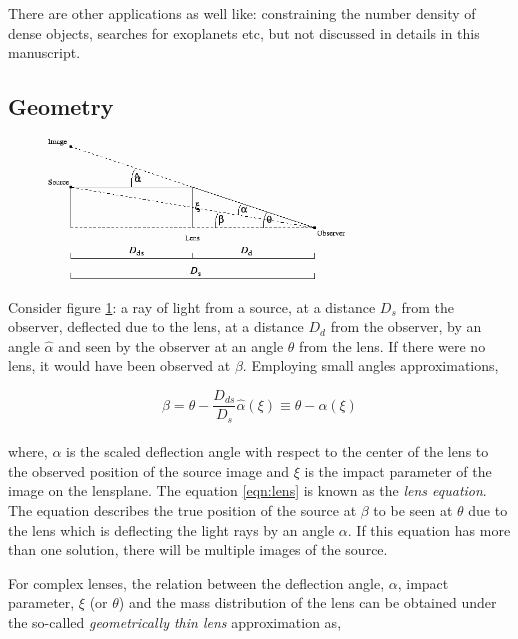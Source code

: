 There are other applications as well like: constraining the number density of dense objects, searches
for exoplanets etc, but not discussed in details in this manuscript. 





\subsection{Geometry}


\begin{figure}
	\centering
	\includegraphics[width=0.7\textwidth]{figures/lens_geometry.png}
	\caption{}
	\label{fig:lens}
\end{figure}

Consider figure \ref{fig:lens}: a ray of light from a source, at a distance $D_s$ from
the observer, deflected due to the lens, at a distance $D_d$ from the observer,  by an 
angle $\hat{\alpha}$ and seen
by the observer at an angle $\theta$ from the lens. If there were no lens, it would have
been observed at $\beta$. Employing small angles approximations, 

\begin{equation}
	\beta  = \theta  - \dfrac{D_{ds}}{D_s} \hat{\alpha}(\xi) \equiv \theta - \alpha(\xi)
	\label{eqn:lens}
\end{equation}
\\
where, $\alpha$ is the scaled deflection angle with respect to the center of the 
lens to the observed position of the source image and $\xi$ is the impact parameter
of the image on the lensplane. The equation \ref{eqn:lens} is known
as the {\it lens equation}. The equation describes the true position of the source at $\beta$ to
be seen at $\theta$ due to the lens which is deflecting the light rays by an angle $\alpha$.
If this equation has more than one solution, there will be multiple images of the source. 

For  complex lenses, the 
relation between the deflection angle, $\alpha$, impact parameter, $\xi$ (or $\theta$) and the mass
distribution of the lens can be obtained under the so-called {\it geometrically thin lens}
approximation as,

